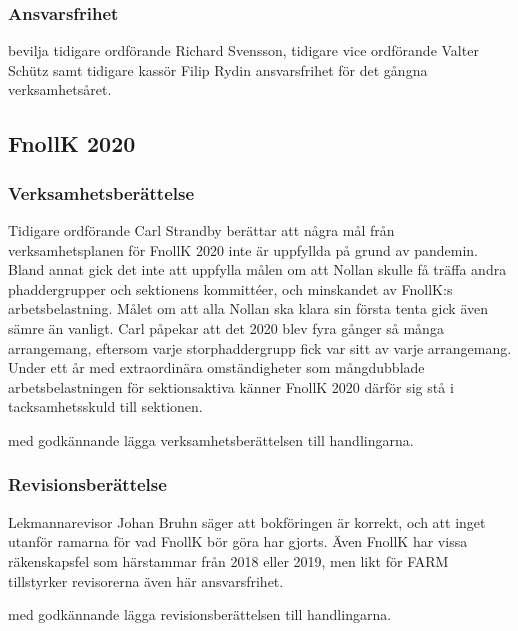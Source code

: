 \documentclass[hidelinks]{sektionsmote}
\begin{document}
\subsubsection{Ansvarsfrihet}
\begin{beslut}
  \item bevilja tidigare ordförande Richard Svensson, tidigare vice ordförande Valter Schütz samt tidigare kassör Filip Rydin ansvarsfrihet för det gångna verksamhetsåret.
\end{beslut}


\subsection{FnollK 2020}
\subsubsection{Verksamhetsberättelse}
Tidigare ordförande Carl Strandby berättar att några mål från verksamhetsplanen för FnollK 2020 inte är uppfyllda på grund av pandemin.
Bland annat gick det inte att uppfylla målen om att Nollan skulle få träffa andra phaddergrupper och sektionens kommittéer, och minskandet av FnollK:s arbetsbelastning.
Målet om att alla Nollan ska klara sin första tenta gick även sämre än vanligt.
Carl påpekar att det 2020 blev fyra gånger så många arrangemang, eftersom varje storphaddergrupp fick var sitt av varje arrangemang.
Under ett år med extraordinära omständigheter som mångdubblade arbetsbelastningen för sektionsaktiva känner FnollK 2020 därför sig stå i tacksamhetsskuld till sektionen.

\begin{beslut}
  \item med godkännande lägga verksamhetsberättelsen till handlingarna.
\end{beslut}


\subsubsection{Revisionsberättelse}
Lekmannarevisor Johan Bruhn säger att bokföringen är korrekt, och att inget utanför ramarna för vad FnollK bör göra har gjorts.
Även FnollK har vissa räkenskapsfel som härstammar från 2018 eller 2019, men likt för FARM tillstyrker revisorerna även här ansvarsfrihet.

\begin{beslut}
  \item med godkännande lägga revisionsberättelsen till handlingarna.%
\end{beslut}
\end{document}

